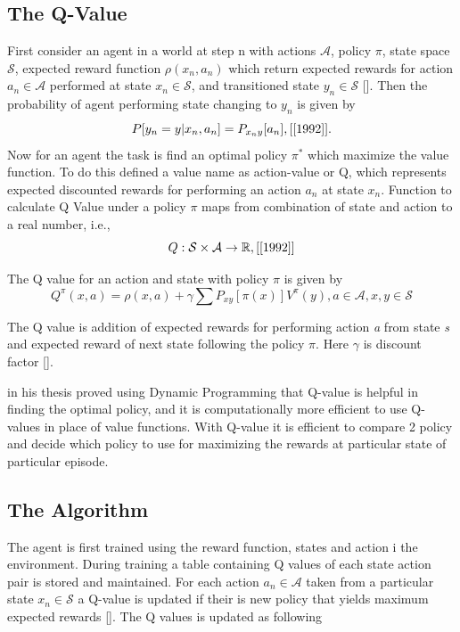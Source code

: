 \documentclass[12pt]{article}
\begin{document}
\subsection{The Q-Value}

First consider an agent in a world at step n with actions $\mathcal{A}$, policy $\pi$, state space $\mathcal{S}$, expected reward function $\rho(x_n,a_n)$ which return expected rewards for action $a_n \in \mathcal{A}$ performed at state $x_n \in \mathcal{S}$, and transitioned state $y_n \in \mathcal{S}$ [\cite{1989}]. Then the probability of agent performing state changing to $y_n$ is given by $$P[y_n = y | x_n, a_n] = P_{x_ny}[a_n], \text{[\cite{1992}]}.$$ Now for an agent the task is find an optimal policy $\pi^*$ which maximize the value function. To do this \cite{1989} defined a value name as action-value or Q, which represents expected discounted rewards for performing an action $a_n$ at state $x_n$. Function to calculate Q Value under a policy $\pi$ maps from combination of state and action to a real number, i.e., $$Q: \mathcal{S} \times \mathcal{A} \rightarrow \mathbb{R}, \text{[\cite{1992}]}$$

The Q value for an action and state with policy $\pi$ is given by $$Q^{\pi}(x,a) = \rho(x,a) + \gamma\sum P_{xy}[\pi(x)]V^{\pi}(y), a \in \mathcal{A}, x,y \in \mathcal{S}$$

The Q value is addition of expected rewards for performing action \textit{a} from state \textit{s} and expected reward of next state following the policy $\pi$. Here $\gamma$ is discount factor [\cite{1992}].

\cite{1989} in his thesis proved using Dynamic Programming that Q-value is helpful in finding the optimal policy, and it is computationally more efficient to use Q-values in place of value functions. With Q-value it is efficient to compare 2 policy and decide which policy to use for maximizing the rewards at particular state of particular episode.

\subsection{The Algorithm}

The agent is first trained using the reward function, states and action i the environment. During training a table containing Q values of each state action pair is stored and maintained. For each action $a_n \in \mathcal{A}$ taken from a particular state $x_n \in \mathcal{S}$ a Q-value is updated if their is new policy that yields maximum expected rewards [\cite{1992}]. The Q values is updated as following
\end{document}
